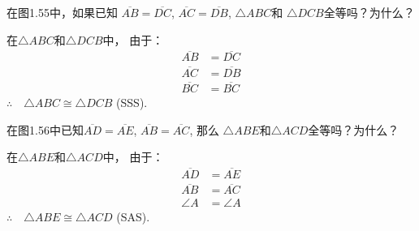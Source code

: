 \begin{example}
    在图1.55中，如果已知
$\overline{AB}=\overline{DC}$, $\overline{AC}=\overline{DB}$, $\triangle ABC$和
$\triangle DCB$全等吗？为什么？
\end{example}

\begin{solution}
	在$\triangle ABC$和$\triangle DCB$中，
由于：
\begin{align*}
	\overline{AB}&=\overline{DC}  \tag{已知}\\
	\overline{AC}&=\overline{DB} \tag{已知}\\
	\overline{BC}&=\overline{BC}  \tag{公共边}	
\end{align*}
$\therefore\quad \triangle ABC\cong \triangle DCB$ (SSS).
\end{solution}


\begin{figure}[htp]\centering
    \begin{minipage}[t]{0.48\textwidth}
    \centering
{}
    \caption{}
    \end{minipage}
    \begin{minipage}[t]{0.48\textwidth}
    \centering
    \caption{}
    \end{minipage}
    \end{figure}

\begin{example}
    在图1.56中已知$\overline{AD}=\overline{AE}$, $\overline{AB}=\overline{AC}$, 那么
$\triangle ABE$和$\triangle ACD$全等吗？为什么？
\end{example}

\begin{solution}
	在$\triangle ABE$和$\triangle ACD$中，
	由于：
\begin{align*}
	\overline{AD}&=\overline{AE}  \tag{已知}\\
	\overline{AB}&=\overline{AC} \tag{已知}\\
	\angle A&=\angle A  \tag{公共角}	
\end{align*}
$\therefore\quad \triangle ABE\cong \triangle ACD$ (SAS).
\end{solution}

